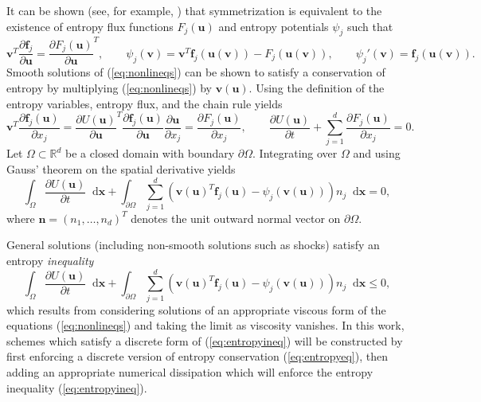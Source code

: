 \documentclass[10pt]{amsart}
\theoremstyle{definition}
\theoremstyle{lemma}
\theoremstyle{theorem}
\theoremstyle{assumption}
\newcommand{\pd}[2]{\frac{\partial#1}{\partial#2}}
\newcommand{\LRp}[1]{\left( #1 \right)}
\newcommand*\diff[1]{\mathop{}\!{\mathrm{d}#1}} %
\begin{document}
It can be shown (see, for example, \cite{mock1980systems}) that symmetrization is equivalent to the existence of entropy flux functions $F_j(\bm{u})$ and entropy potentials $\psi_j$ such that
\[
\bm{v}^T \pd{\bm{f}_j}{\bm{u}} = \pd{F_j(\bm{u})}{\bm{u}}^T, \qquad \psi_j(\bm{v}) = \bm{v}^T\bm{f}_j(\bm{u}(\bm{v})) - F_j(\bm{u}(\bm{v})), \qquad \psi_j'(\bm{v}) = \bm{f}_j(\bm{u}(\bm{v})).
\]
Smooth solutions of (\ref{eq:nonlineqs}) can be shown to satisfy a conservation of entropy by multiplying (\ref{eq:nonlineqs}) by $\bm{v}(\bm{u})$. Using the definition of the entropy variables, entropy flux, and the chain rule yields
\begin{equation}
\bm{v}^T\pd{\bm{f}_j(\bm{u})}{x_j} = \pd{U(\bm{u})}{\bm{u}}^T\pd{\bm{f}_j(\bm{u})}{\bm{u}}\pd{\bm{u}}{x_j} = \pd{F_j(\bm{u})}{x_j}, \qquad \pd{U(\bm{u})}{t} + \sum_{j=1}^d \pd{F_j(\bm{u})}{x_j} = 0.
\label{eq:chainrule}
\end{equation}
%
Let $\Omega \subset \mathbb{R}^d$ be a closed domain with boundary $\partial \Omega$.  Integrating over $\Omega$ and using Gauss' theorem on the spatial derivative yields
\begin{equation}
  \int_{\Omega}\pd{U(\bm{u})}{t}\diff{\bm{x}} + \int_{\partial \Omega} \sum_{j=1}^d \LRp{\bm{v}{(\bm{u})}^T\bm{f}_j(\bm{u}) - \psi_j\LRp{\bm{v}(\bm{u})}}n_j \diff{\bm{x}} = 0,
\label{eq:entropyeq}
\end{equation}
where $\bm{n} = \LRp{n_1,\ldots,n_d}^T$ denotes the unit outward normal vector on $\partial \Omega$.  

General solutions (including non-smooth solutions such as shocks) satisfy an entropy \emph{inequality}
\begin{equation}
  \int_{\Omega}\pd{U(\bm{u})}{t}\diff{\bm{x}} + \int_{\partial \Omega} \sum_{j=1}^d \LRp{\bm{v}{(\bm{u})}^T\bm{f}_j(\bm{u}) - \psi_j\LRp{\bm{v}(\bm{u})}}n_j \diff{\bm{x}} \leq 0,
\label{eq:entropyineq}
\end{equation}
which results from considering solutions of an appropriate viscous form of the equations (\ref{eq:nonlineqs}) and taking the limit as viscosity vanishes.  In this work, schemes which satisfy a discrete form of (\ref{eq:entropyineq}) will be constructed by first enforcing a discrete version of entropy conservation (\ref{eq:entropyeq}), then adding an appropriate numerical dissipation which will enforce the entropy inequality (\ref{eq:entropyineq}).  
\end{document}
